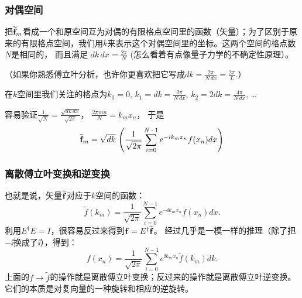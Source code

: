 \documentclass[CJK,13pt]{beamer}
\begin{document}
\begin{frame}
  \frametitle{对偶空间}
  把$\widetilde{{\mathbf{f}}}_m$看成一个和原空间互为对偶的有限格点空间里的函数（矢量）；为了区别于原来的有限格点空间，我们用$k$来表示这个对偶空间里的坐标。这两个空间的格点数$N$是相同的，
  而且满足 {\blue $dk\, dx = \frac{2\pi}{N}$} (怎么看着有点像量子力学的不确定性原理）。

      {\scriptsize （如果你熟悉傅立叶分析，也许你更喜欢把它写成$dk = \frac{2\pi}{N\,dx}=\frac{2\pi}{L}$.）}

  \skipline
      
  在$k$空间里我们关注的格点为$k_0=0$, $k_1=dk = \frac{2\pi}{N\,dx}$, $k_2=2dk=\frac{4\pi}{N\,dx}$, \ldots

  容易验证$\frac{1}{\sqrt{N}} = \frac{\sqrt{dk\, dx}}{\sqrt{2\pi}}$， $\frac{2\pi mn}{N} = k_mx_n $， 于是
  $$\widetilde{{\mathbf{f}}}_m = \sqrt{dk} \, \left(\frac{1}{\sqrt{2\pi}}\sum_{i=0}^{N-1} e^{-{\dot{\imath}} k_m x_n} f(x_n) dx \right)$$

\end{frame}

\begin{frame}
  \frametitle{离散傅立叶变换和逆变换}
  也就是说，矢量$\widetilde{{\mathbf{f}}}$对应于$k$空间的函数：
  $$ \widetilde{f}(k_m)= \frac{1}{\sqrt{2\pi}}\sum_{i=0}^{N-1} e^{-\ii k_m x_n} f(x_n) dx. $$
  利用$E^\dagger E = I$，很容易反过来得到${\mathbf{f}} = E^\dagger \widetilde{{\mathbf{f}}}$。
  经过几乎是一模一样的推理（除了把$-\ii$换成了$\ii$），得到：
  $$f(x_n) = \frac{1}{\sqrt{2\pi}} \sum_{i=0}^{N-1}e^{\ii k_m x_n} \widetilde{f}(k_m) dk .$$
  上面的$f\rightarrow \widetilde{f}$的操作就是离散傅立叶变换；反过来的操作就是离散傅立叶逆变换。它们的本质是对复向量的一种旋转和相应的逆旋转。
\end{frame}

\ech
\end{document}
